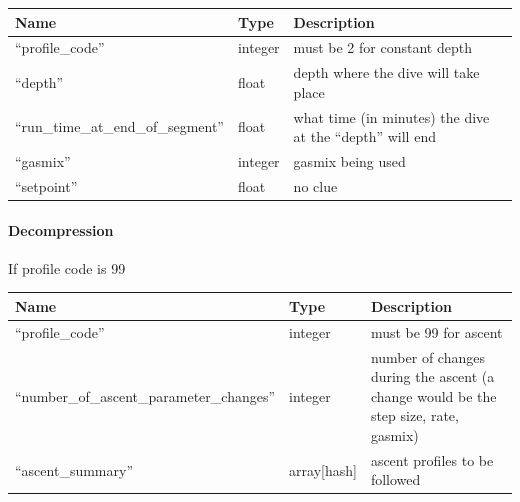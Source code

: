 \documentclass[12pt]{article}
\begin{document}
\begin{longtable}{|l|l|p{5cm}|}
\hline
 Name                                 &  Type     &  Description                                                \\
\hline
 ``profile\_code''                    &  integer  &  must be 2 for constant depth                               \\
\hline
 ``depth''                            &  float    &  depth where the dive will take place                       \\
\hline
 ``run\_time\_at\_end\_of\_segment''  &  float    &  what time (in minutes) the dive at the ``depth'' will end  \\
\hline
 ``gasmix''                           &  integer  &  gasmix being used                                          \\
\hline
 ``setpoint''                         &  float    &  no clue                                                    \\
\hline
\end{longtable}

\paragraph{Decompression}

If profile code is 99

\begin{longtable}{|l|l|p{5cm}|}
\hline
 Name                                        &  Type         &  Description                                                                          \\
\hline
 ``profile\_code''                           &  integer      &  must be 99 for ascent                                                                \\
\hline
 ``number\_of\_ascent\_parameter\_changes''  &  integer      &  number of changes during the ascent (a change would be the step size, rate, gasmix)  \\
\hline
 ``ascent\_summary''                         &  array[hash]  &  ascent profiles to be followed                                                       \\
\hline
\end{longtable}
\end{document}
